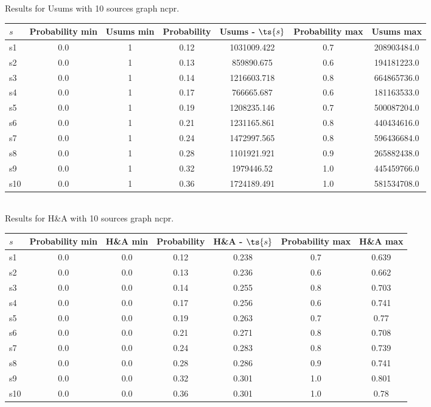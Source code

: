 \documentclass{article}
\begin{document}
\noindent Results for Usums with 10 sources graph ncpr.

\noindent\begin{tabular}{|l|c|c|c|c|c|c|}
\hline
$s$& Probability min & Usums min & Probability & Usums - $\ts{s}$ & Probability max & Usums max\\
\hline
s1 &0.0 & 1 & 0.12 & 1031009.422 & 0.7 & 208903484.0\\
\hline
s2 &0.0 & 1 & 0.13 & 859890.675 & 0.6 & 194181223.0\\
\hline
s3 &0.0 & 1 & 0.14 & 1216603.718 & 0.8 & 664865736.0\\
\hline
s4 &0.0 & 1 & 0.17 & 766665.687 & 0.6 & 181163533.0\\
\hline
s5 &0.0 & 1 & 0.19 & 1208235.146 & 0.7 & 500087204.0\\
\hline
s6 &0.0 & 1 & 0.21 & 1231165.861 & 0.8 & 440434616.0\\
\hline
s7 &0.0 & 1 & 0.24 & 1472997.565 & 0.8 & 596436684.0\\
\hline
s8 &0.0 & 1 & 0.28 & 1101921.921 & 0.9 & 265882438.0\\
\hline
s9 &0.0 & 1 & 0.32 & 1979446.52 & 1.0 & 445459766.0\\
\hline
s10 &0.0 & 1 & 0.36 & 1724189.491 & 1.0 & 581534708.0\\
\hline
\end{tabular}\\

\noindent Results for H\&A with 10 sources graph ncpr.

\noindent\begin{tabular}{|l|c|c|c|c|c|c|}
\hline
$s$& Probability min & H\&A min & Probability & H\&A - $\ts{s}$ & Probability max & H\&A max\\
\hline
s1 &0.0 & 0.0 & 0.12 & 0.238 & 0.7 & 0.639\\
\hline
s2 &0.0 & 0.0 & 0.13 & 0.236 & 0.6 & 0.662\\
\hline
s3 &0.0 & 0.0 & 0.14 & 0.255 & 0.8 & 0.703\\
\hline
s4 &0.0 & 0.0 & 0.17 & 0.256 & 0.6 & 0.741\\
\hline
s5 &0.0 & 0.0 & 0.19 & 0.263 & 0.7 & 0.77\\
\hline
s6 &0.0 & 0.0 & 0.21 & 0.271 & 0.8 & 0.708\\
\hline
s7 &0.0 & 0.0 & 0.24 & 0.283 & 0.8 & 0.739\\
\hline
s8 &0.0 & 0.0 & 0.28 & 0.286 & 0.9 & 0.741\\
\hline
s9 &0.0 & 0.0 & 0.32 & 0.301 & 1.0 & 0.801\\
\hline
s10 &0.0 & 0.0 & 0.36 & 0.301 & 1.0 & 0.78\\
\hline
\end{tabular}\\
\end{document}
